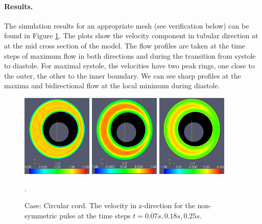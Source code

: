 \paragraph{Results.}
The simulation results for an appropriate mesh (see verification below) can be found in Figure \ref{fig:case1}. The plots show the velocity component in tubular direction at at the mid cross section of the model. The flow profiles are taken at the time steps of maximum flow in both directions and during the transition from systole to diastole. For maximal systole, the velocities have two peak rings, one close to the outer, the other to the inner boundary. We can see sharp profiles at the maxima and bidirectional flow at the local minimum during diastole.


\begin{figure}\begin{center}
\includegraphics[width=0.3\textwidth]{chapters/hentschel/pdf/pulse_f1_08_sysmax_nmb7.pdf}
\includegraphics[width=0.3\textwidth]{chapters/hentschel/pdf/pulse_f1_08_sysdia_nmb18.pdf}
\includegraphics[width=0.3\textwidth]{chapters/hentschel/pdf/pulse_f1_08_diamin1_nmb25.pdf}
\caption{Case: Circular cord. The velocity in z-direction for the non-symmetric pulse at the time steps $t=0.07s, 0.18s, 0.25s$.}
\label{fig:case1}.
\end{center}\end{figure}


